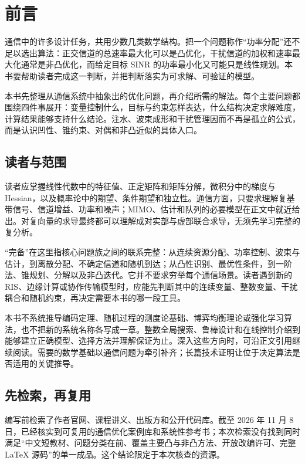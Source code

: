 \chapter*{前言}

通信中的许多设计任务，共用少数几类数学结构。把一个问题称作“功率分配”还不足以选出算法：正交信道的总速率最大化可以是凸优化，干扰信道的加权和速率最大化通常是非凸优化，而给定目标 SINR 的功率最小化又可能只是线性规划。本书要帮助读者完成这一判断，并把判断落实为可求解、可验证的模型。

本书先整理从通信系统中抽象出的优化问题，再介绍所需的解法。每个主要问题都围绕四件事展开：变量控制什么，目标与约束怎样表达，什么结构决定求解难度，计算结果能够支持什么结论。注水、波束成形和干扰管理因而不再是孤立的公式，而是认识凹性、锥约束、对偶和非凸近似的具体入口。

\section*{读者与范围}

读者应掌握线性代数中的特征值、正定矩阵和矩阵分解，微积分中的梯度与 Hessian，以及概率论中的期望、条件期望和独立性。通信方面，只要求理解复基带信号、信道增益、功率和噪声；MIMO、估计和队列的必要模型在正文中就近给出。对复向量的求导最终都可以理解成对实部与虚部联合求导，无须先学习完整的复分析。

“完备”在这里指核心问题族之间的联系完整：从连续资源分配、功率控制、波束与估计，到离散分配、不确定信道和随机到达；从凸性识别、最优性条件，到一阶法、锥规划、分解以及非凸迭代。它并不要求穷举每个通信场景。读者遇到新的 RIS、边缘计算或协作传输模型时，应能先判断其中的连续变量、整数变量、干扰耦合和随机约束，再决定需要本书的哪一段工具。

本书不系统推导编码定理、随机过程的测度论基础、博弈均衡理论或强化学习算法，也不把新的系统名称各写成一章。整数全局搜索、鲁棒设计和在线控制介绍到能够建立正确模型、选择方法并理解保证为止。深入这些方向时，可沿正文引用继续阅读。需要的数学基础以通信问题为牵引补齐；长篇技术证明让位于决定算法是否适用的关键推导。

\section*{先检索，再复用}

编写前检索了作者官网、课程讲义、出版方和公开代码库。截至 2026 年 11 月 8 日，已经核实到可复用的通信优化案例库和系统性参考书；本次检索没有找到同时满足“中文短教材、问题分类在前、覆盖主要凸与非凸方法、开放改编许可、完整 LaTeX 源码”的单一成品。这个结论限定于本次核查的资源。

